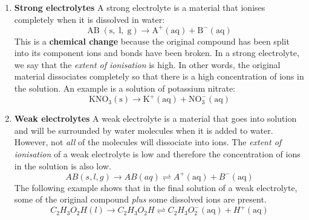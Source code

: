         \label{m38720*id338697}\begin{enumerate}[noitemsep, label=\textbf{\arabic*}. ] 
            \label{m38720*uid53}\item \textbf{Strong electrolytes}
A strong electrolyte is a material that ionises completely when it is dissolved in water:
\label{m38720*id338720}\nopagebreak\noindent{}
    \begin{equation}
    \mathrm{AB\; \left(s,\; l,\; g\right)}\to {\mathrm{A}}^{+}\mathrm{\left(aq\right)}+{\mathrm{B}}^{-}\mathrm{\left(aq\right)}\tag{17.3}
      \end{equation}
This is a \textbf{chemical change} because the original compound has been split into its component ions and bonds have been broken. In a strong electrolyte, we say that the \textsl{extent of ionisation} is high. In other words, the original material dissociates completely so that there is a high concentration of ions in the solution. An example is a solution of potassium nitrate:
\label{m38720*id338807}\nopagebreak\noindent{}
    \begin{equation}
    {\mathrm{KNO}}_{3}\mathrm{\left(s\right)}\to {\mathrm{K}}^{+}\mathrm{\left(aq\right)}+\mathrm{NO}_{3}^{-}\mathrm{\left(aq\right)}\tag{17.4}
      \end{equation}
    \label{m38720*uid54}\item \textbf{Weak electrolytes}
A weak electrolyte is a material that goes into solution and will be surrounded by water molecules when it is added to water. However, not \textsl{all} of the molecules will dissociate into ions. The \textsl{extent of ionisation} of a weak electrolyte is low and therefore the concentration of ions in the solution is also low.
\label{m38720*id338913}\nopagebreak\noindent{}
    \begin{equation}
    AB\left(s,l,g\right)\to AB\left(aq\right)⇌{A}^{+}\left(\mathrm{aq}\right)+{B}^{-}\left(\mathrm{aq}\right)\tag{17.5}
      \end{equation}
The following example shows that in the final solution of a weak electrolyte, some of the original compound \textsl{plus} some dissolved ions are present.
\label{m38720*id339008}\nopagebreak\noindent{}
    \begin{equation}
    {C}_{2}{H}_{3}{O}_{2}H\left(l\right)\to {C}_{2}{H}_{3}{O}_{2}H⇌{C}_{2}{H}_{3}O_{2}^{-}\left(\mathrm{aq}\right)+{H}^{+}\left(\mathrm{aq}\right)\tag{17.6}
      \end{equation}
    \end{enumerate}
      \label{m38720*uid55}
